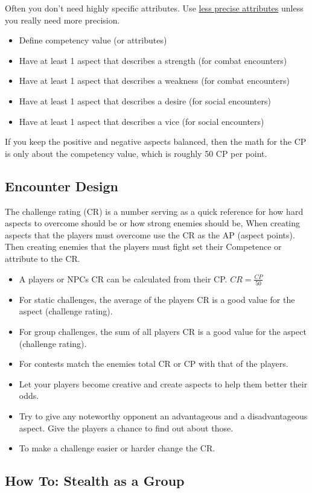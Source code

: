 \documentclass[11pt]{article}
\begin{document}
{Often you don't need highly specific attributes. Use \hyperref[sec:org4e3cb3f]{less precise attributes} unless you really need more precision.
\begin{itemize}
\item Define competency value (or attributes)
\item Have at least 1 aspect that describes a strength (for combat encounters)
\item Have at least 1 aspect that describes a weakness (for combat encounters)
\item Have at least 1 aspect that describes a desire (for social encounters)
\item Have at least 1 aspect that describes a vice (for social encounters)
\end{itemize}
If you keep the positive and negative aspects balanced, then the math for the CP is only about the competency value, which is roughly 50 CP per point.
\subsection{Encounter Design}
\label{sec:org717193a}

The challenge rating (CR) is a number serving as a quick reference for how hard aspects to overcome should be or how strong enemies should be, When creating aspects that the players must overcome use the CR as the AP (aspect points). Then creating enemies that the players must fight set their Competence or attribute to the CR.
\begin{itemize}
\item A players or NPCs CR can be calculated from their CP. \(CR = \frac{CP}{50}\)
\item For static challenges, the average of the players CR is a good value for the aspect (challenge rating).
\item For group challenges, the sum of all players CR is a good value for the aspect (challenge rating).
\item For contests match the enemies total CR or CP with that of the players.
\item Let your players become creative and create aspects to help them better their odds.
\item Try to give any noteworthy opponent an advantageous and a disadvantageous aspect. Give the players a chance to find out about those.
\item To make a challenge easier or harder change the CR.
\end{itemize}
\subsection{How To: Stealth as a Group}
\label{sec:org3e5d1a0}

}
\end{document}
